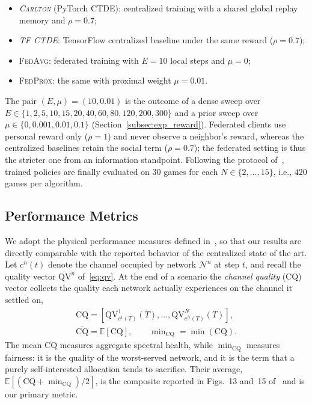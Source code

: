 \documentclass[journal]{IEEEtran}
\newcommand{\CARLTON}{\textsc{Carlton}}
\newcommand{\FedAvg}{\textsc{FedAvg}}
\newcommand{\FedProx}{\textsc{FedProx}}
\begin{document}
\begin{itemize}
\item \emph{\CARLTON{}} (PyTorch CTDE): centralized training with a shared
  global replay memory and $\rho=0.7$;
\item \emph{TF CTDE}: TensorFlow centralized baseline under the same reward
  ($\rho=0.7$);
\item \FedAvg{}: federated training with $E=10$ local steps and $\mu=0$;
\item \FedProx{}: the same with proximal weight $\mu=0.01$.
\end{itemize}

The pair $(E,\mu)=(10,0.01)$ is the outcome of a dense sweep over
$E\in\{1,2,5,10,15,20,40,60,80,120,200,300\}$ and a prior sweep over
$\mu\in\{0,0.001,0.01,0.1\}$ (Section~\ref{subsec:exp_reward}). Federated clients use
personal reward only ($\rho=1$) and never observe a neighbor's reward, whereas
the centralized baselines retain the social term ($\rho=0.7$); the federated
setting is thus the stricter one from an information standpoint. Following the
protocol of~\cite{cohen2024carlton}, trained policies are finally evaluated on
$30$ games for each $N\in\{2,\dots,15\}$, i.e., $420$ games per algorithm.

\subsection{Performance Metrics}
\label{subsec:exp_metrics}

We adopt the physical performance measures defined
in~\cite{cohen2024carlton}, so that our results are directly comparable with
the reported behavior of the centralized state of the art. Let $c^{n}(t)$
denote the channel occupied by network $\mathcal{N}^{n}$ at step $t$, and
recall the quality vector $\mathrm{QV}^{n}$ of~\eqref{eq:qv}. At the end of a
scenario the \emph{channel quality} (CQ) vector collects the quality each
network actually experiences on the channel it settled on,
\begin{equation}
\begin{gathered}
\mathrm{CQ}=\left[\mathrm{QV}^{1}_{c^{1}(T)}(T),\dots,
\mathrm{QV}^{N}_{c^{N}(T)}(T)\right],\\
\overline{\mathrm{CQ}}=\mathbb{E}[\mathrm{CQ}],\qquad
\min\nolimits_{\mathrm{CQ}}=\min(\mathrm{CQ}).
\end{gathered}
\label{eq:cq}
\end{equation}
The mean $\overline{\mathrm{CQ}}$ measures aggregate spectral health, while
$\min_{\mathrm{CQ}}$ measures fairness: it is the quality of the
worst-served network, and it is the term that a purely self-interested
allocation tends to sacrifice. Their average,
$\mathbb{E}[(\mathrm{CQ}+\min_{\mathrm{CQ}})/2]$, is the composite reported in
Figs.~13 and~15 of~\cite{cohen2024carlton} and is our primary metric.
\end{document}
